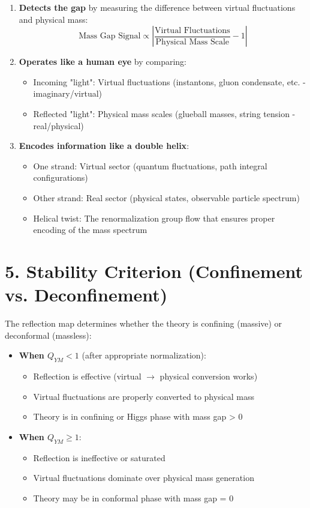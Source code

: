 \documentclass[11pt]{article}
\begin{document}
\begin{enumerate}
\item \textbf{Detects the gap} by measuring the difference between virtual fluctuations and physical mass:
  \[
  \text{Mass Gap Signal} \propto \left| \frac{\text{Virtual Fluctuations}}{\text{Physical Mass Scale}} - 1 \right|
  \]

\item \textbf{Operates like a human eye} by comparing:
  \begin{itemize}
  \item Incoming "light": Virtual fluctuations (instantons, gluon condensate, etc. - imaginary/virtual)
  \item Reflected "light": Physical mass scales (glueball masses, string tension - real/physical)
  \end{itemize}

\item \textbf{Encodes information like a double helix}:
  \begin{itemize}
  \item One strand: Virtual sector (quantum fluctuations, path integral configurations)
  \item Other strand: Real sector (physical states, observable particle spectrum)
  \item Helical twist: The renormalization group flow that ensures proper encoding of the mass spectrum
  \end{itemize}
\end{enumerate}

\section{5. Stability Criterion (Confinement vs. Deconfinement)}

The reflection map determines whether the theory is confining (massive) or deconformal (massless):

\begin{itemize}
\item \textbf{When $Q_{YM} < 1$} (after appropriate normalization):
  \begin{itemize}
  \item Reflection is effective (virtual $\rightarrow$ physical conversion works)
  \item Virtual fluctuations are properly converted to physical mass
  \item Theory is in confining or Higgs phase with mass gap > 0
  \end{itemize}
\item \textbf{When $Q_{YM} \geq 1$}:
  \begin{itemize}
  \item Reflection is ineffective or saturated
  \item Virtual fluctuations dominate over physical mass generation
  \item Theory may be in conformal phase with mass gap = 0
  \end{itemize}
\end{itemize}
\end{document}
